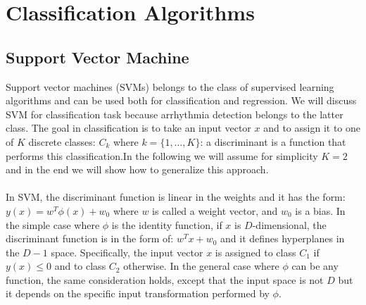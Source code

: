 \documentclass[LaM,binding=0.6cm]{sapthesis}
\begin{document}
%

\chapter{Classification Algorithms}

\section{Support Vector Machine}
Support vector machines (SVMs) belongs to the class of supervised learning algorithms and can be used both for classification and regression. We will discuss SVM for classification task because arrhythmia detection belongs to the latter class. The goal in classification is to take an input vector $x$ and to assign it to one of $K$ discrete classes: $C_k$ where $k = \{1,\dots,K\}$: a discriminant is a function that performs this classification.In the following we will assume for simplicity $K=2$ and in the end we will show how to generalize this approach.\\\\In SVM, the discriminant function is linear in the weights and it has the form: $y(x)= w^T\phi(x)+w_0 $ where $w$ is called a weight vector, and $w_0$ is a bias. In the simple case where $\phi$ is the identity function, if $x$ is $D$-dimensional, the discriminant function is in the form of: $w^Tx+w_0 $ and it defines hyperplanes in the $D-1$ space. Specifically, the input vector $x$ is assigned to class $C_1$ if $y(x)\leq0$ and to class $C_2$ otherwise. In the general case where $\phi$ can be any function, the same consideration holds, except that the input space is not $D$ but it depends on the specific input transformation performed by $\phi$.
\end{document}
